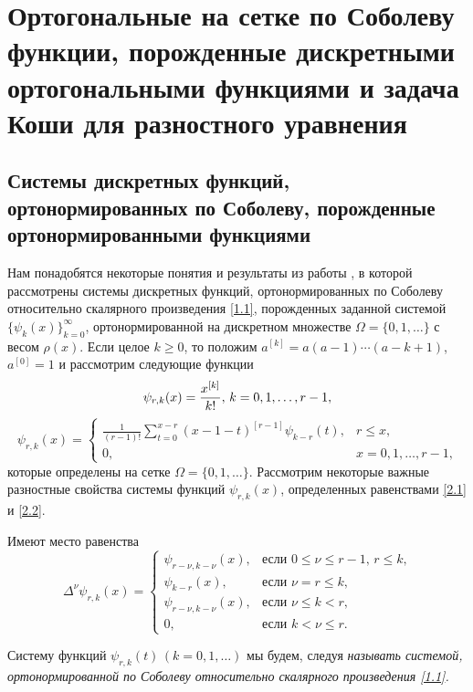 \chapter{Ортогональные на сетке по Соболеву функции, порожденные дискретными ортогональными функциями  и задача Коши для разностного уравнения}

\section{Системы дискретных функций, ортонормированных по Соболеву, порожденные  ортонормированными  функциями}

Нам понадобятся некоторые понятия и результаты из работы \cite{shGadj}, в которой рассмотрены системы дискретных функций, ортонормированных по Соболеву относительно скалярного произведения \eqref{1.1}, порожденных заданной системой $\{\psi_k(x)\}_{k=0}^\infty$, ортонормированной на дискретном множестве $\Omega=\{0,1,\ldots\}$ с весом $\rho(x)$.  Если целое $k\ge0$, то положим $a^{[k]}=a(a-1)\cdots (a-k+1)$, $a^{[0]}=1$ и рассмотрим следующие функции
\begin{equation}\label{2.1}
\psi_{r,k}(x)={x^{[k]}\over k!},\, k=0,1,\ldots,r-1,
\end{equation}
\begin{equation}\label{2.2}
\psi_{r,k}(x)=\begin{cases}\frac{1}{(r-1)!}\sum\limits_{t=0}^{x-r}(x-1-t)^{[r-1]}\psi_{k-r}(t),
&\text{$r\le x$,}\\ 0,&\text{$x=0,1,\ldots, r-1$,}
\end{cases}
\end{equation}
которые определены на сетке $\Omega=\{0,1,\ldots\}$. Рассмотрим некоторые важные разностные  свойства системы функций $\psi_{r,k}(x)$, определенных равенствами \eqref{2.1} и \eqref{2.2}.

\begin{lemma}\label{RII}
Имеют место равенства
\begin{equation}\label{2.3}
\Delta^\nu \psi_{r,k}(x)=\begin{cases}\psi_{r-\nu,k-\nu}(x),&\text{если $0\le\nu\le r-1$, $r\le k$,}\\
\psi_{k-r}(x),&\text{если  $\nu=r\le k$,}\\
\psi_{r-\nu,k-\nu}(x),&\text{если $\nu\le k< r$,}\\
0,&\text{если $k< \nu\le r$}.
  \end{cases}
\end{equation}
\end{lemma}
Систему функций $\psi_{r,k}(t)\, (k=0,1,\ldots)$ мы будем, следуя \cite{shGadj} \textit {называть системой, ортонормированной по Соболеву относительно скалярного произведения \eqref{1.1}.}

